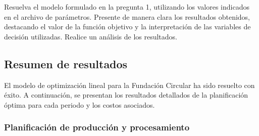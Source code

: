 \label{q:pregunta2}

Resuelva el modelo formulado en la pregunta 1, utilizando los valores indicados en el archivo de parámetros. Presente de manera clara los resultados obtenidos, destacando el valor de la función objetivo y la interpretación de las variables de decisión utilizadas. Realice un análisis de los resultados.

\answer

\subsection*{Resumen de resultados}

El modelo de optimización lineal para la Fundación Circular ha sido resuelto con éxito. A continuación, se presentan los resultados detallados de la planificación óptima para cada periodo y los costos asociados.

\subsubsection*{Planificación de producción y procesamiento}

\begin{table}[H]
\centering
\caption{Planificación de producción y satisfacción de demanda por periodo}
\label{tab:produccion}
\end{table}

